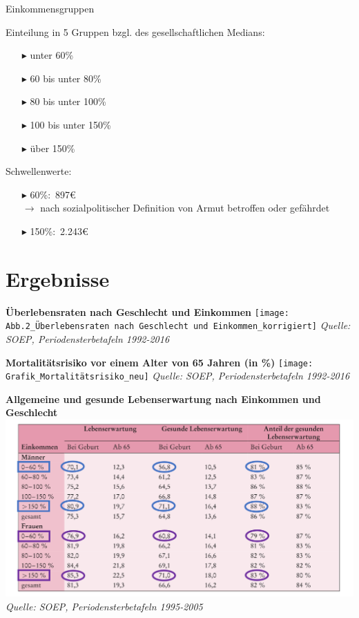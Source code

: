 \documentclass{beamer}
\begin{document}
\begin{frame}{Einkommensgruppen}
	\begin{block}{Einteilung in 5 Gruppen bzgl. des gesellschaftlichen Medians:}
		\begin{itemize}
			\item[$\blacktriangleright$] unter 60\%
			\item[$\blacktriangleright$] 60 bis unter 80\%
			\item[$\blacktriangleright$] 80 bis unter 100\%
			\item[$\blacktriangleright$] 100 bis unter 150\%
			\item[$\blacktriangleright$] über 150\%
		\end{itemize}
	\end{block}
	\begin{block}{Schwellenwerte:}
		\begin{itemize}
			\item[$\blacktriangleright$] 60\%:\, 897€ \\ $\rightarrow$ nach sozialpolitischer Definition von Armut betroffen oder gefährdet
			\item[$\blacktriangleright$] 150\%:\, 2.243€
		\end{itemize}
	\end{block}
\end{frame}



\section{Ergebnisse}
\begin{frame}
\textbf{Überlebensraten nach Geschlecht und Einkommen}
	\texttt{[image: Abb.2\_Überlebensraten nach Geschlecht und Einkommen\_korrigiert]}
	\emph{Quelle: SOEP, Periodensterbetafeln 1992-2016}
\end{frame}

\begin{frame}
\textbf{Mortalitätsrisiko vor einem Alter von 65 Jahren (in \%) }
	\texttt{[image: Grafik\_Mortalitätsrisiko\_neu]}
	\emph{Quelle: SOEP, Periodensterbetafeln 1992-2016}
\end{frame}

\begin{frame}
  \textbf{Allgemeine und gesunde Lebenserwartung nach Einkommen und Geschlecht}\\
	\includegraphics[scale=0.46]{Tabelle_ellipsen}
	\emph{Quelle: SOEP, Periodensterbetafeln 1995-2005}
\end{frame}
 
\end{document}

